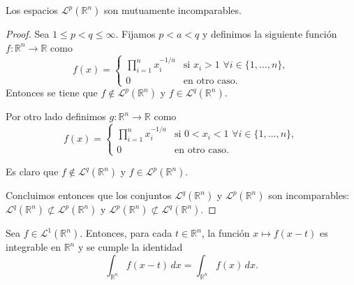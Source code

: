 \begin{proposicion} \label{prop:inco}
Los espacios $\mathscr{L}^p(\mathbb{R}^n)$ son mutuamente incomparables. 
\end{proposicion}
\begin{proof}
    Sea $1 \leq p < q \leq \infty$. Fijamos $p < a < q$ y definimos la siguiente función $f: \mathbb{R}^n \rightarrow \mathbb{R}$ como
    \begin{equation}
        f(x) = \begin{cases}
    \prod_{i=1}^n x_i^{-1/a} & \text{si } x_i > 1 \, \, \forall i \in \{1,\ldots, n\}, \\
    0 & \text{en otro caso. } 
\end{cases}
    \end{equation}
Entonces se tiene que $f \notin \mathscr{L}^p(\mathbb{R}^n)$ y $f \in \mathscr{L}^q(\mathbb{R}^n)$.

\noindent Por otro lado definimos $g: \mathbb{R}^n \rightarrow \mathbb{R}$  como
 \begin{equation}
        f(x) = \begin{cases}
    \prod_{i=1}^n x_i^{-1/a} & \text{si } 0< x_i < 1 \, \, \forall i \in \{1,\ldots, n\}, \\
    0 & \text{en otro caso. } 
\end{cases}
\end{equation}

\noindent Es claro que $f \notin \mathscr{L}^q(\mathbb{R}^n)$ y $f \in \mathscr{L}^p(\mathbb{R}^n)$.

\noindent Concluimos entonces que   los conjuntos $\mathscr{L}^q(\mathbb{R}^n)$ y $\mathscr{L}^p(\mathbb{R}^n)$ son incomparables:
$\mathscr{L}^q(\mathbb{R}^n) \not\subset \mathscr{L}^p(\mathbb{R}^n)$ y $\mathscr{L}^p(\mathbb{R}^n) \not\subset \mathscr{L}^q(\mathbb{R}^n)$.
\end{proof}

\begin{proposicion}
Sea $f\in \mathscr{L}^1(\mathbb{R}^n)$. Entonces, para cada $t \in \mathbb{R}^n$, la función $x \mapsto f(x-t)$ es integrable en $\mathbb{R}^n$ y se cumple la identidad
\begin{equation}
    \int_{\mathbb{R}^n}f(x-t) \, dx = \int_{\mathbb{R}^n}f(x)\, dx.
\end{equation}
\end{proposicion}


